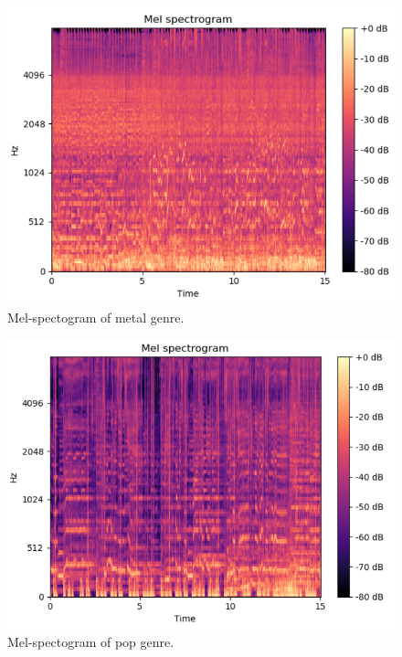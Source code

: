 \begin{figure}
\begin{center}
\includegraphics[scale=0.2]{./figures/metal.png}
\end{center}
\caption
{
Mel-spectogram of metal genre.
}
\label{fig:big_picture2}
\end{figure}

\begin{figure}
\begin{center}
\includegraphics[scale=0.2]{./figures/pop.png}
\end{center}
\caption
{
Mel-spectogram of pop genre. 
}
\label{fig:big_picture3}
\end{figure}

